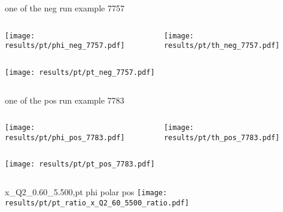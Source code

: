 \begin{frame}{one of the neg run example 7757}
\begin{columns}
\begin{column}[T]{0.5\textwidth}
\texttt{[image: results/pt/phi\_neg\_7757.pdf]}
\end{column}
\begin{column}[T]{0.5\textwidth}
\texttt{[image: results/pt/th\_neg\_7757.pdf]}
\end{column}
\end{columns}
\begin{columns}
\begin{column}[T]{0.5\textwidth}
\texttt{[image: results/pt/pt\_neg\_7757.pdf]}
\end{column}
\begin{column}[T]{0.5\textwidth}
\end{column}
\end{columns}
\end{frame}
\begin{frame}{one of the pos run example 7783}
\begin{columns}
\begin{column}[T]{0.5\textwidth}
\texttt{[image: results/pt/phi\_pos\_7783.pdf]}
\end{column}
\begin{column}[T]{0.5\textwidth}
\texttt{[image: results/pt/th\_pos\_7783.pdf]}
\end{column}
\end{columns}
\begin{columns}
\begin{column}[T]{0.5\textwidth}
\texttt{[image: results/pt/pt\_pos\_7783.pdf]}
\end{column}
\begin{column}[T]{0.5\textwidth}
\end{column}
\end{columns}
\end{frame}
\begin{frame}{x\_Q2\_0.60\_5.500,pt phi polar pos}
\texttt{[image: results/pt/pt\_ratio\_x\_Q2\_60\_5500\_ratio.pdf]}
\end{frame}
